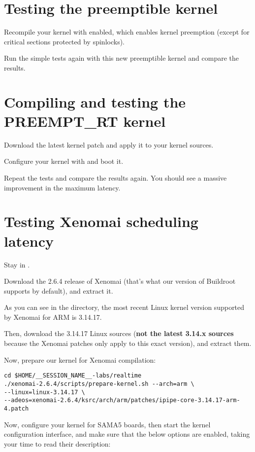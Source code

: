 \section{Testing the preemptible kernel}

Recompile your kernel with  enabled, which
enables kernel preemption (except for critical sections protected by
spinlocks).

Run the simple tests again with this new preemptible kernel and compare
the results.

\section{Compiling and testing the PREEMPT\_RT kernel}

Download the latest  kernel patch and apply it to
your kernel sources.

Configure your kernel with  and boot it.

Repeat the tests and compare the results again. You should see a massive
improvement in the maximum latency.

\section{Testing Xenomai scheduling latency}

Stay in .

Download the 2.6.4 release of Xenomai (that's what our version of
Buildroot supports by default), and extract it.

As you can see in the  directory,
the most recent Linux kernel version supported by Xenomai for ARM is
3.14.17.

Then, download the 3.14.17 Linux sources ({\bf not the latest 3.14.x
sources} because the Xenomai patches only apply to this exact version),
and extract them.
 
Now, prepare our kernel for Xenomai compilation:
\begin{verbatim}
cd $HOME/__SESSION_NAME__-labs/realtime
./xenomai-2.6.4/scripts/prepare-kernel.sh --arch=arm \
--linux=linux-3.14.17 \
--adeos=xenomai-2.6.4/ksrc/arch/arm/patches/ipipe-core-3.14.17-arm-4.patch
\end{verbatim}

Now, configure your kernel for SAMA5 boards, then start the kernel
configuration interface, and make sure that the below options are
enabled, taking your time to read their description:

